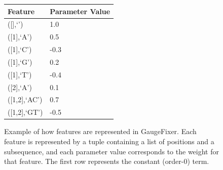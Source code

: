 
\begin{figure}[t]
    \centering
    \begin{tabular}{ll}
        \toprule
        \textbf{Feature} & \textbf{Parameter Value} \\
        \midrule
        ([],`') & 1.0 \\
        ([1],`A') & 0.5 \\
        ([1],`C') & -0.3 \\
        ([1],`G') & 0.2 \\
        ([1],`T') & -0.4 \\
        ([2],`A') & 0.1 \\
        ([1,2],`AC') & 0.7 \\
        ([1,2],`GT') & -0.5 \\
        \bottomrule
    \end{tabular}
    \caption{Example of how features are represented in GaugeFixer. Each feature is represented by a tuple containing a list of positions and a subsequence, and each parameter value corresponds to the weight for that feature. The first row represents the constant (order-0) term.}
    \label{fig:features}
\end{figure}